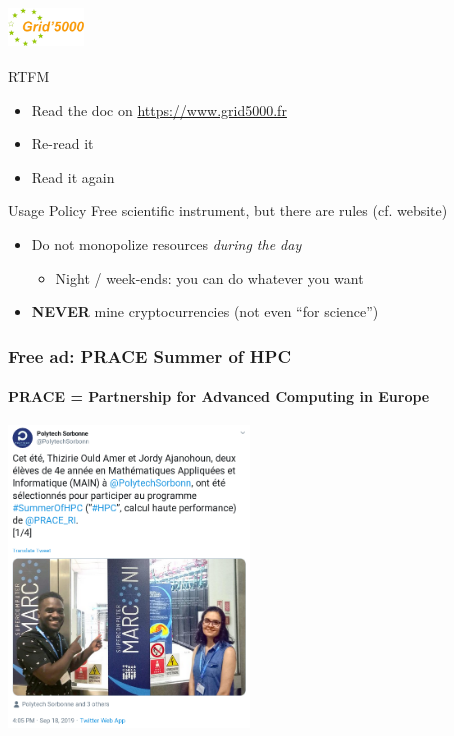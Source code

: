 \documentclass[10pt]{beamer}
\begin{document}

\begin{frame}[label=tme]
  \frametitle{\includegraphics[height=1cm]{grid5000_logo.png}}

  \begin{exampleblock}{RTFM}
    \begin{itemize}
    \item Read the doc on \url{https://www.grid5000.fr}
    \item Re-read it
    \item Read it again
    \end{itemize}
  \end{exampleblock}
  
  \medskip

  \begin{alertblock}{Usage Policy}
    Free scientific instrument, but there are rules (cf. website)
    \begin{itemize}
    \item Do not monopolize resources \emph{during the day}
      \begin{itemize}
      \item Night / week-ends: you can do whatever you want
      \end{itemize}
    \item \textbf{NEVER} mine cryptocurrencies (not even ``for science'')
    \end{itemize}
  \end{alertblock}
  
\end{frame}


 \begin{frame}
   \frametitle{Free ad: PRACE Summer of HPC}
   \framesubtitle{PRACE = Partnership for Advanced Computing in Europe}
   \centering
   \includegraphics[height=8cm]{PRACE_twitter.png}
 \end{frame}
\end{document}
